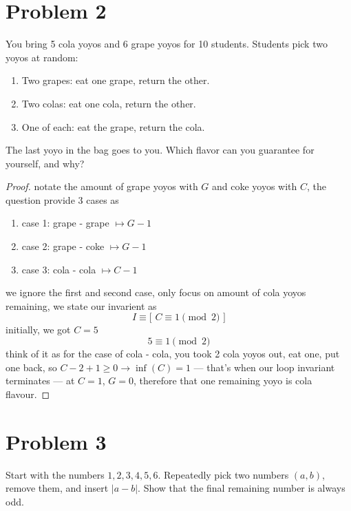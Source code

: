 \vspace{1em}
\hrulefill

\section*{Problem 2}
You bring 5 cola yoyos and 6 grape yoyos for 10 students. Students pick two yoyos at random:
\begin{enumerate}[label=\alph*.]
    \item Two grapes: eat one grape, return the other.
    \item Two colas: eat one cola, return the other.
    \item One of each: eat the grape, return the cola.
\end{enumerate}
The last yoyo in the bag goes to you. Which flavor can you guarantee for yourself, and why?

\medskip
\solution

\begin{proof}
notate the amount of grape yoyos with $G$ and coke yoyos with
$C$, the question provide 3 cases as
\begin{enumerate}[label={}]
\item case 1: grape - grape $\mapsto G - 1$
\item case 2: grape - coke $\mapsto G - 1$
\item case 3: cola - cola $\mapsto C - 1$
\end{enumerate}
we ignore the first and second case, only focus on amount of
cola yoyos remaining, we state our invarient as
\[
I \equiv \text{[ }C \equiv 1 \pmod 2 \text{ ]}
\]
initially, we got $C = 5$
\[
5 \equiv 1 \pmod 2
\]
think of it as for the case of cola - cola, you took 2
cola yoyos out, eat one, put one back, so $C - 2 + 1 \ge 0
\rightarrow \inf(C) = 1$ --- that's when our loop invariant
terminates --- at $C = 1$, $G = 0$, therefore that one
remaining yoyo is cola flavour.
\end{proof}

\vspace{1em}
\hrulefill

\section*{Problem 3}
Start with the numbers $1,2,3,4,5,6$. Repeatedly pick two numbers $(a,b)$, remove them, and insert $|a-b|$. Show that the final remaining number is always odd.

\medskip
\solution


